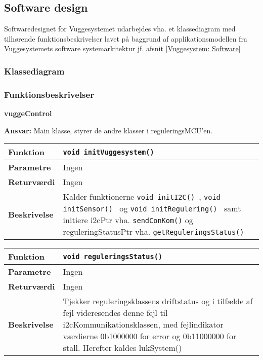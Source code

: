 \newpage
\subsection{Software design}
Softwaredesignet for Vuggesystemet udarbejdes vha. et klassediagram med tilhørende funktionsbeskrivelser lavet på baggrund af applikationsmodellen fra Vuggesystemets software systemarkitektur jf. afsnit \ref{Vuggesystem: Software}

\subsubsection*{Klassediagram}

\subsubsection*{Funktionsbeskrivelser}
\label{vugsys:design_funkBeskrivelser}
{\centering
\textbf{vuggeControl}\par
}
\textbf{Ansvar:} Main klasse, styrer de andre klasser i reguleringsMCU'en. \

\begin{center}
    \begin{tabular}{ | l | p{} |}
    \hline
    \textbf{Funktion}	& \verb+void initVuggesystem() +						\\ \hline
    \textbf{Parametre} 	& Ingen		\\ \hline
    \textbf{Returværdi}	& Ingen 								\\ \hline
    \textbf{Beskrivelse}	& Kalder funktionerne \verb+void initI2C() +, \verb+void initSensor() + og \verb+void initRegulering() + samt initiere i2cPtr vha. \verb+sendConKom()+ og reguleringStatusPtr vha. \verb+getReguleringsStatus() +		\\ \hline
    \end{tabular}
\end{center}

\begin{center}
    \begin{tabular}{ | l | p{} |}
    \hline
    \textbf{Funktion}	& \verb+void reguleringsStatus() +						\\ \hline
    \textbf{Parametre} 	& Ingen		\\ \hline
    \textbf{Returværdi}	& Ingen 								\\ \hline
    \textbf{Beskrivelse}	& Tjekker reguleringsklassens driftstatus og i tilfælde af fejl videresendes denne fejl til i2cKommunikationsklassen, med fejlindikator værdierne 0b1000000 for error og 0b11000000 for stall. Herefter kaldes lukSystem()		\\ \hline
    \end{tabular}
\end{center}

